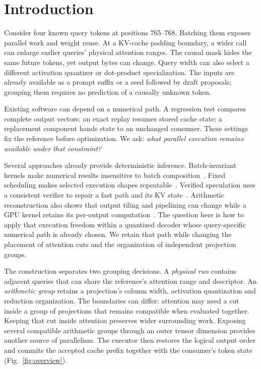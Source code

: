 \section{Introduction}
\label{sec:introduction}

Consider four known query tokens at positions 765--768. Batching them exposes parallel work and weight reuse. At a KV-cache padding boundary, a wider call can enlarge earlier queries' physical attention ranges. The causal mask hides the same future tokens, yet output bytes can change. Query width can also select a different activation quantizer or dot-product specialization. The inputs are already available as a prompt suffix or a seed followed by draft proposals; grouping them requires no prediction of a causally unknown token.

Existing software can depend on a numerical path. A regression test compares complete output vectors; an exact replay resumes stored cache state; a replacement component hands state to an unchanged consumer. These settings fix the reference before optimization. We ask: \emph{what parallel execution remains available under that constraint?}

Several approaches already provide deterministic inference. Batch-invariant kernels make numerical results insensitive to batch composition~\cite{thinkingmachines}. Fixed scheduling makes selected execution shapes repeatable~\cite{corun}. Verified speculation uses a consistent verifier to repair a fast path and its KV state~\cite{llm42}. Arithmetic reconstruction also shows that output tiling and pipelining can change while a GPU kernel retains its per-output computation~\cite{taming}. The question here is how to apply that execution freedom within a quantized decoder whose query-specific numerical path is already chosen. We retain that path while changing the placement of attention cuts and the organization of independent projection groups.

The construction separates two grouping decisions. A \emph{physical run} contains adjacent queries that can share the reference's attention range and descriptor. An \emph{arithmetic group} retains a projection's column width, activation quantization and reduction organization. The boundaries can differ: attention may need a cut inside a group of projections that remains compatible when evaluated together. Keeping that cut inside attention preserves wider surrounding work. Exposing several compatible arithmetic groups through an outer tensor dimension provides another source of parallelism. The executor then restores the logical output order and commits the accepted cache prefix together with the consumer's token state (Fig.~\ref{fig:overview}).

